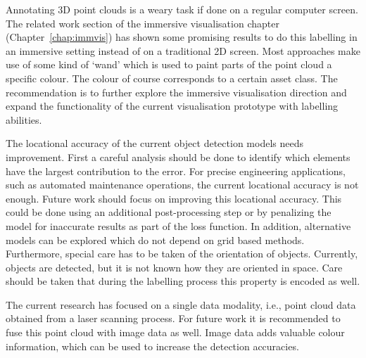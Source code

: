 Annotating 3D point clouds is a weary task if done on a regular computer screen. The related work section of the immersive visualisation chapter (Chapter~\ref{chap:immvis}) has shown some promising results to do this labelling in an immersive setting instead of on a traditional 2D screen. Most approaches make use of some kind of `wand' which is used to paint parts of the point cloud a specific colour. The colour of course corresponds to a certain asset class.  The recommendation is to further explore the immersive visualisation direction and expand the functionality of the current visualisation prototype with labelling abilities.

The locational accuracy of the current object detection models needs improvement. First a careful analysis should be done to identify which elements have the largest contribution to the error. For precise engineering applications, such as automated maintenance operations, the current locational accuracy is not enough. Future work should focus on improving this locational accuracy. This could be done using an additional post-processing step or by penalizing the model for inaccurate results as part of the loss function. In addition, alternative models can be explored which do not depend on grid based methods. Furthermore, special care has to be taken of the orientation of objects. Currently, objects are detected, but it is not known how they are oriented in space. Care should be taken that during the labelling process this property is encoded as well.

The current research has focused on a single data modality, i.e., point cloud data obtained from a laser scanning process. For future work it is recommended to fuse this point cloud with image data as well. Image data adds valuable colour information, which can be used to increase the detection accuracies.

\clearpage
\printbibliography[heading=subbibnumbered]